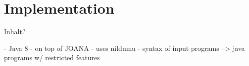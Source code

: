 \chapter{Implementation}

Inhalt?

- Java 8
- on top of JOANA
- uses nildumu
- syntax of input programs --> java programs w/ restricted features

